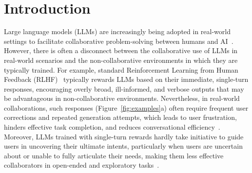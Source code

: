 
\section{Introduction}

Large language models (LLMs) are increasingly being adopted in real-world settings to facilitate collaborative problem-solving between humans and AI~\citep{rethinking_conv_agent, neural_approach, clarify_survey}. 
However, there is often a disconnect between the collaborative use of LLMs in real-world scenarios and the non-collaborative environments in which they are typically trained. For example, standard Reinforcement Learning from Human Feedback (RLHF)~\citep{rlhf} typically rewards LLMs based on their immediate, single-turn responses, encouraging overly broad, ill-informed, and verbose outputs that may be advantageous in non-collaborative environments. Nevertheless, in real-world collaborations, such responses  (\eg Figure~\ref{fig:examples}a) often require  frequent user corrections and repeated generation attempts, which leads to user frustration, hinders effective task completion, and reduces conversational efficiency~\cite{}. 
Moreover, LLMs trained with single-turn rewards hardly take initiative to guide users in uncovering their ultimate intents, particularly when users are uncertain about or unable to fully articulate their needs, making them less effective collaborators in open-ended and exploratory tasks~\cite{understand_user_experience}.

